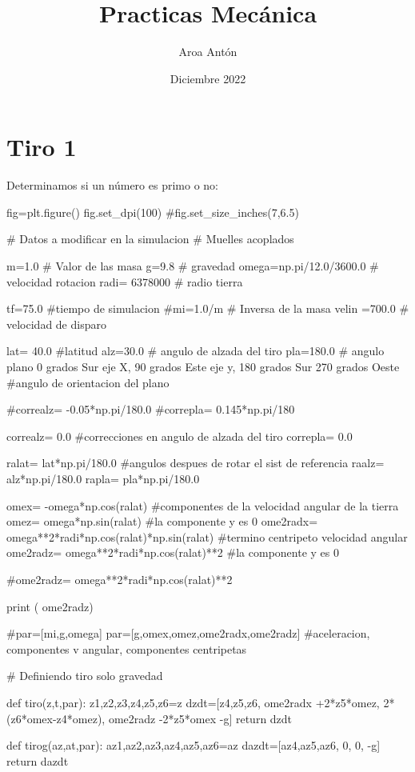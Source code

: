 \documentclass{article}
\title{Practicas Mecánica}
\author{Aroa Antón}
\date{Diciembre 2022}
\begin{document}
\maketitle

\section{Tiro 1}
Determinamos si un número es primo o no:
\begin{python}
fig=plt.figure()
fig.set_dpi(100)
#fig.set_size_inches(7,6.5)


# Datos a modificar en la simulacion 
# Muelles acoplados

m=1.0      # Valor de las masa
g=9.8      # gravedad
omega=np.pi/12.0/3600.0     # velocidad rotacion
radi= 6378000  # radio tierra

tf=75.0    #tiempo de simulacion
#mi=1.0/m   # Inversa de la masa
velin =700.0 # velocidad de disparo



lat= 40.0  #latitud
alz=30.0 # angulo de alzada del tiro
pla=180.0  # angulo plano 0 grados Sur eje X, 90 grados Este eje y, 180 grados Sur 270 grados Oeste
#angulo de orientacion del plano

#correalz= -0.05*np.pi/180.0
#correpla= 0.145*np.pi/180

correalz= 0.0 #correcciones en angulo de alzada del tiro 
correpla= 0.0

ralat= lat*np.pi/180.0 #angulos despues de rotar el sist de referencia
raalz= alz*np.pi/180.0
rapla= pla*np.pi/180.0

omex= -omega*np.cos(ralat) #componentes de la velocidad angular de la tierra
omez= omega*np.sin(ralat) #la componente y es 0
ome2radx= omega**2*radi*np.cos(ralat)*np.sin(ralat) #termino centripeto velocidad angular
ome2radz= omega**2*radi*np.cos(ralat)**2 #la componente y es 0

#ome2radz= omega**2*radi*np.cos(ralat)**2

print ( ome2radz)

#par=[mi,g,omega]
par=[g,omex,omez,ome2radx,ome2radz] #aceleracion, componentes v angular, componentes centripetas


# Definiendo tiro solo gravedad

def tiro(z,t,par):
    z1,z2,z3,z4,z5,z6=z  
    dzdt=[z4,z5,z6, 
          ome2radx +2*z5*omez,
          2*(z6*omex-z4*omez),
          ome2radz -2*z5*omex -g]
    return dzdt


def tirog(az,at,par):
    az1,az2,az3,az4,az5,az6=az  
    dazdt=[az4,az5,az6, 0, 0, -g]
    return dazdt



\end{python}
\end{document}
